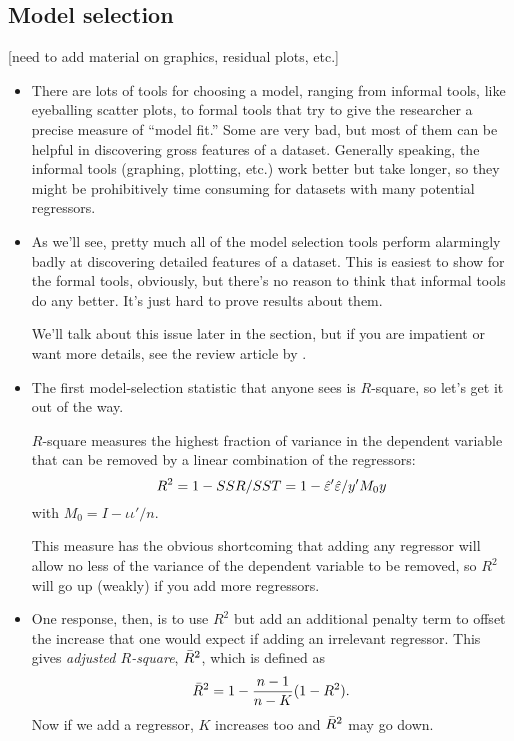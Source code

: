 \subsection{Model selection}

[need to add material on graphics, residual plots, etc.]

\begin{itemize}[leftmargin=0pt]

\item There are lots of tools for choosing a model, ranging from
  informal tools, like eyeballing scatter plots, to formal tools that
  try to give the researcher a precise measure of ``model fit.''  Some
  are very bad, but most of them can be helpful in discovering gross
  features of a dataset.  Generally speaking, the informal tools
  (graphing, plotting, etc.) work better but take longer, so they
  might be prohibitively time consuming for datasets with many
  potential regressors.

\item As we'll see, pretty much all of the model selection tools
  perform alarmingly badly at discovering detailed features of a
  dataset.  This is easiest to show for the formal tools, obviously,
  but there's no reason to think that informal tools do any better.
  It's just hard to prove results about them.

  We'll talk about this issue later in the section, but if you are
  impatient or want more details, see the review article by
  \citet{LP05}.

\item The first model-selection statistic that anyone sees is
  $R$-square, so let's get it out of the way.

  \begin{defn} $R$-square measures the highest
    fraction of variance in the dependent variable that can be removed
    by a linear combination of the regressors:
    \begin{equation*}
      R^2 = 1 - SSR/SST = 1 - \hat{\varepsilon}'\hat{\varepsilon}/y'M_0y
    \end{equation*}
    with $M_0 = I - \iota \iota' / n$.
  \end{defn}

  This measure has the obvious shortcoming that adding any regressor
  will allow no less of the variance of the dependent variable to be
  removed, so $R^2$ will go up (weakly) if you add more regressors.

\item One response, then, is to use $R^2$ but add an additional
  penalty term to offset the increase that one would expect if adding
  an irrelevant regressor.  This gives \emph{adjusted $R$-square},
  $\bar{R}^2$, which is defined as
  \begin{equation*}
    \bar{R}^2 = 1 - \frac{n-1}{n-K}(1-R^2).
  \end{equation*}
  Now if we add a regressor, $K$ increases too and $\bar{R}^2$ may go
  down.


\end{itemize}
